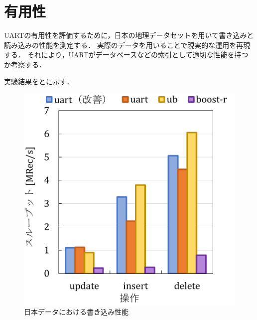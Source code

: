 \section{有用性}

UARTの有用性を評価するために，日本の地理データセットを用いて書き込みと読み込みの性能を測定する．
実際のデータを用いることで現実的な運用を再現する．
それにより，UARTがデータベースなどの索引として適切な性能を持つか考察する．

実験結果を\Fig{\ref{graph:japan-wr}}と\Fig{\ref{graph:japan-wr}}に示す．
\begin{figure}[tb]
  \begin{minipage}[c]{0.495\textwidth}
    \centering
    \includegraphics[scale=0.5]{./figures/graph-japan-write.pdf}
    \caption{日本データにおける書き込み性能}
    \label{graph:japan-wr}
  \end{minipage}
  \begin{minipage}[c]{0.495\textwidth}
    \centering

\end{minipage}
\end{figure}
